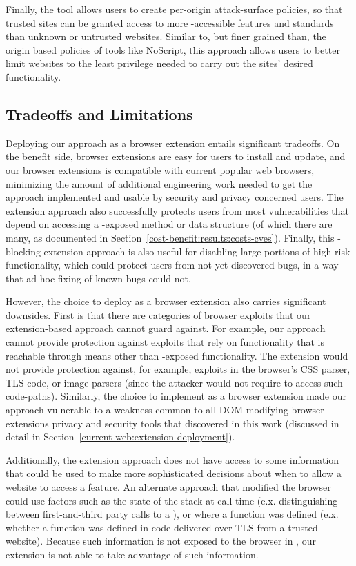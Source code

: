 Finally, the tool allows users to create per-origin attack-surface policies,
so that trusted sites can be granted access to more \JS-accessible
features and standards than unknown or untrusted websites.  Similar to, but
finer grained than, the origin based policies of tools like NoScript, this
approach allows users to better limit websites to the least privilege
needed to carry out the sites' desired functionality.


\subsection{Tradeoffs and Limitations}
Deploying our approach as a browser extension entails significant tradeoffs.
On the benefit side, browser extensions are easy for users to install and update,
and our browser extensions is compatible with current popular web browsers,
minimizing the amount of additional engineering work needed to get the approach
implemented and usable by security and privacy concerned users.  The extension
approach also successfully protects users from most vulnerabilities that depend
on accessing a \JS-exposed method or data structure (of which there are many, as
documented in Section~\ref{cost-benefit:results:costs-cves}).  Finally,
this \WAS-blocking extension approach is also useful for disabling large
portions of high-risk functionality, which could protect users from not-yet-discovered
bugs, in a way that ad-hoc fixing of known bugs could not.

However, the choice to deploy as a browser extension also carries significant
downsides. First is that there are categories of browser exploits
that our extension-based approach cannot guard against.  For example, our
approach cannot provide protection against exploits that rely on \WAPI
functionality that is reachable through means other than \JS-exposed
functionality.  The extension would not provide protection against, for example,
exploits in the browser's CSS parser, TLS code, or image parsers (since the
attacker would not require \JS to access such code-paths).  Similarly,
the choice to implement as a browser extension made our approach
vulnerable to a weakness common to all DOM-modifying browser extensions privacy
and security tools that discovered in this work (discussed in detail in
Section~\ref{current-web:extension-deployment}).

Additionally, the extension approach does not have access to some
information that could be used to make more sophisticated decisions about
when to allow a website to access a feature.  An alternate approach that
modified the browser could use factors such as the state of the stack at
call time (e.x. distinguishing between first-and-third party calls
to a \WAS), or where a function was defined (e.x. whether a function was defined
in \JS code delivered over TLS from a trusted website).  Because such information
is not exposed to the browser in \JS, our extension is not able to take advantage
of such information.


